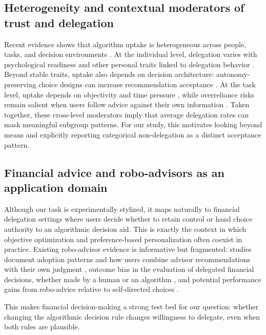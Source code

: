 \documentclass[a4paper, 12pt, fleqn]{article}
\theoremstyle{definition}
\begin{document}
\subsection{Heterogeneity and contextual moderators of trust and delegation}
Recent evidence shows that algorithm uptake is heterogeneous across people, tasks, and decision environments \citep{Ferraz2025,Yang2025}. At the individual level, delegation varies with psychological readiness and other personal traits linked to delegation behavior \citep{Kim2026,Ferraz2025}. Beyond stable traits, uptake also depends on decision architecture: autonomy-preserving choice designs can increase recommendation acceptance \citep{Fink2024}. At the task level, uptake depends on objectivity and time pressure \citep{Yang2025}, while overreliance risks remain salient when users follow advice against their own information \citep{Klingbeil2024}. Taken together, these cross-level moderators imply that average delegation rates can mask meaningful subgroup patterns. For our study, this motivates looking beyond means and explicitly reporting categorical non-delegation as a distinct acceptance pattern.

\subsection{Financial advice and robo-advisors as an application domain}
Although our task is experimentally stylized, it maps naturally to financial delegation settings where users decide whether to retain control or hand choice authority to an algorithmic decision aid. This is exactly the context in which objective optimization and preference-based personalization often coexist in practice. Existing robo-advisor evidence is informative but fragmented: studies document adoption patterns and how users combine advisor recommendations with their own judgment \citep{Figa-Talamanca2022,Mahmud2025}, outcome bias in the evaluation of delegated financial decisions, whether made by a human or an algorithm \citep{Ismagilova2025}, and potential performance gains from robo-advice relative to self-directed choices \citep{Lambrecht2023}. 

This makes financial decision-making a strong test bed for our question: whether changing the algorithmic decision rule changes willingness to delegate, even when both rules are plausible.
\end{document}
